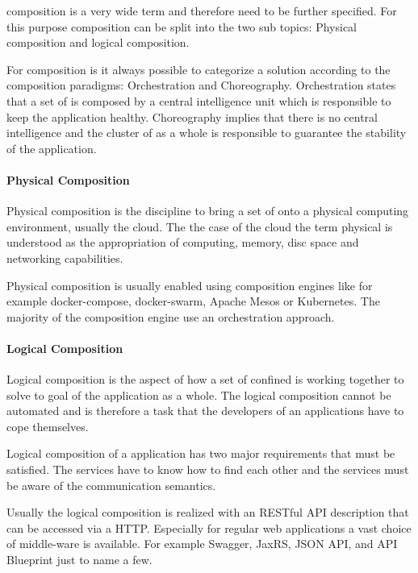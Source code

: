 \ms{} composition is a very wide term and therefore need to be further
specified. For this purpose composition can be split into the two sub topics:
Physical composition and logical composition.

For \ms{} composition is it always possible to categorize a solution according
to the composition paradigms: Orchestration and Choreography. Orchestration
states that a set of \mss{} is composed by a central intelligence unit which is
responsible to keep the application healthy. Choreography implies that there is
no central intelligence and the cluster of \mss{} as a whole is responsible to
guarantee the stability of the application.

\paragraph{Physical Composition}

Physical composition is the discipline to bring a set of \mss{} onto a
physical computing environment, usually the cloud. The the case of the cloud the
term physical is understood as the appropriation of computing, memory, disc
space and networking capabilities.

Physical composition is usually enabled using composition engines like for
example docker-compose, docker-swarm, Apache Mesos or Kubernetes. The majority
of the composition engine use an orchestration approach. 

\paragraph{Logical Composition}

Logical composition is the aspect of how a set of confined \ms{} is working
together to solve to goal of the application as a whole. The logical composition
cannot be automated and is therefore a task that the developers of an
applications have to cope themselves. 

Logical composition of a \ms{} application has two major requirements that must
be satisfied. The services have to know how to find each other and the services
must be aware of the communication semantics. 

Usually the logical composition is realized with an RESTful API description that
can be accessed via a HTTP. Especially for regular web applications a vast
choice of middle-ware is available. For example Swagger, JaxRS, JSON API, and
API Blueprint just to name a few.

